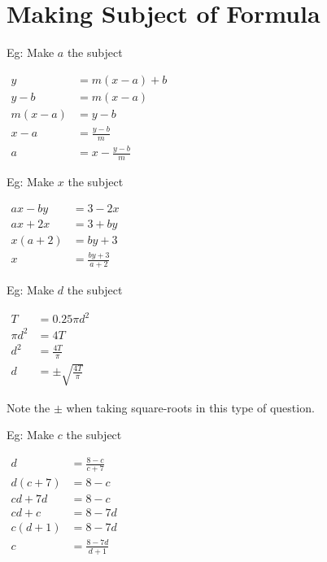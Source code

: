 \documentclass[twocolumn]{article}
\begin{document}
\section*{Making Subject of Formula}

\bigskip 

\noindent 
Eg: Make $a$ the subject

\noindent 
$\begin{aligned} y & = m(x-a)+b \\ y-b & =m(x-a) \\ m(x-a) & =y-b \\ x-a & =\frac{y-b}{m} \\ a & =x-\frac{y-b}{m}\end{aligned}$

\bigskip 

\noindent 
Eg: Make $x$ the subject

\noindent 
$\begin{aligned} a x-b y & =3-2 x \\ a x+2 x & =3+b y \\ x(a+2) & =b y+3 \\ x & =\frac{b y+3}{a+2}\end{aligned}$

\bigskip 

\noindent 
Eg: Make $d$ the subject

\noindent 
$\begin{aligned} T & =0.25 \pi d^2 \\ \pi d^2 & =4 T \\ d^2 & =\frac{4 T}{\pi} \\ d & = \pm \sqrt{\frac{4 T}{\pi}}\end{aligned}$

\noindent
Note the $\pm$ when taking square-roots in this type of question.

\bigskip 

\noindent 
Eg: Make $c$ the subject

\noindent 
$\begin{aligned} d & =\frac{8-c}{c+7} \\ d(c+7) & =8-c \\ c d+7 d & =8-c \\ c d+c & =8-7 d \\ c(d+1) & =8-7 d \\ c & =\frac{8-7 d}{d+1}\end{aligned}$

\bigskip 

\bigskip 
\end{document}
